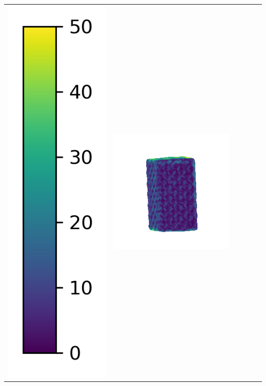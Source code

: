 \begin{tabularx}{\linewidth}{@{}Y@{}Y@{}Y@{}Y@{}Y@{}Y@{}}
\includegraphics[width=0.2\linewidth]{semisynthetic/colorbar_error_vertical.png} &
\includegraphics[width=\linewidth]{semisynthetic/20150514_18_ours_err.png} &

\end{tabularx}
